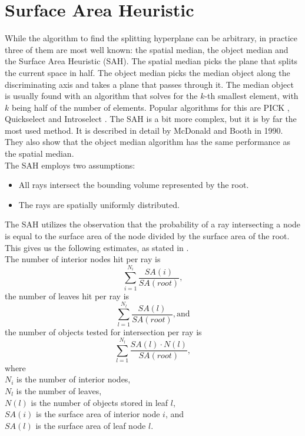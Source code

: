 \documentclass[12pt]{article}
\begin{document}
\section{Surface Area Heuristic}
While the algorithm to find the splitting hyperplane can be arbitrary, in practice three of them are most well known: the spatial median, the object median and the Surface Area Heuristic (SAH). The spatial median picks the plane that splits the current space in half. The object median picks the median object along the discriminating axis and takes a plane that passes through it. The median object is usually found with an algorithm that solves for the $k$-th smallest element, with $k$ being half of the number of elements. Popular algorithms for this are PICK \cite{blum1973time}, Quickselect \cite{gibb1961algorithm} and Introselect \cite{musser1997introspective}. The SAH is a bit more complex, but it is by far the most used method. It is described in detail by McDonald and Booth \cite{macdonald1990heuristics} in 1990. They also show that the object median algorithm has the same performance as the spatial median.\\
\noindent The SAH employs two assumptions: 
\begin{itemize}
  \item All rays intersect the bounding volume represented by the root.
  \item The rays are spatially uniformly distributed.
\end{itemize}
The SAH utilizes the observation that the probability of a ray intersecting a node is equal to the surface area of the node divided by the surface area of the root. This gives us the following estimates, as stated in \cite{macdonald1990heuristics}.\\
The number of interior nodes hit per ray is
\[
	\sum_{i=1}^{N_i}{\frac{SA(i)}{SA(root)}},
\]
the number of leaves hit per ray is
\[
	\sum_{l=1}^{N_l}{\frac{SA(l)}{SA(root)}}, \text{and}
\]
the number of objects tested for intersection per ray is
\[
	\sum_{l=1}^{N_l}{\frac{SA(l)\cdot N(l)}{SA(root)}},
\]
where\\
$N_i$ is the number of interior nodes,\\
$N_l$ is the number of leaves,\\
$N(l)$ is the number of objects stored in leaf $l$,\\
$SA(i)$ is the surface area of interior node $i$, and\\
$SA(l)$ is the surface area of leaf node $l$.\\
\end{document}
